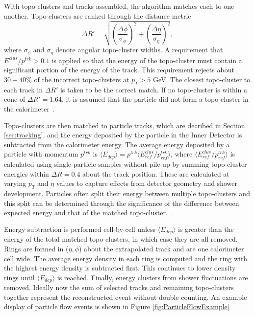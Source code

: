 With topo-clusters and tracks assembled, the algorithm matches each to one another. Topo-clusters are ranked through the distance metric 
\begin{equation}
\Delta R' = \sqrt{(\frac{\Delta \phi}{\sigma_\phi})^2+(\frac{\Delta \eta}{\sigma_\eta})^2},
\end{equation}
where $\sigma_\phi$ and $\sigma_\eta$ denote angular topo-cluster widths. A requirement that $E^{clus}/p^{trk}>0.1$ is applied so that the energy of the topo-cluster must contain a significant portion of the energy of the track. This requirement rejects about $30-40\%$ of the incorrect topo-clusters at $p_T>5$ GeV. The closest topo-cluster to each track in $\Delta R'$ is taken to be the correct match. If no topo-cluster is within a cone of $\Delta R'= 1.64$, it is assumed that the particle did not form a topo-cluster in the calorimeter~\cite{ParticleFlow}. 

Topo-clusters are then matched to particle tracks, which are decribed in Section \ref{sec:tracking}, and the energy deposited by the particle in the Inner Detector is subtracted from the calorimeter energy. The average energy deposited by a particle with momentum $p^{trk}$ is $\langle E_{dep} \rangle=p^{trk}\langle E_{ref}^{clus}/p_{ref}^{trk}\rangle$, where $\langle E_{ref}^{clus}/p_{ref}^{trk} \rangle$ is calculated using single-particle samples without pile-up by summing topo-cluster energies within $\Delta R = 0.4$ about the track position. These are calculated at varying $p_T$ and $\eta$ values to capture effects from detector geometry and shower development. Particles often split their energy between multiple topo-clusters and this split can be determined through the significance of the difference between expected energy and that of the matched topo-cluster.~\cite{ParticleFlow}. 

Energy subtraction is performed cell-by-cell unless $\langle E_{dep} \rangle$ is greater than the energy of the total matched topo-clusters, in which case they are all removed. Rings are formed in ($\eta,\phi$) about the extrapolated track and are one calorimeter cell wide. The average energy density in each ring is computed and the ring with the highest energy density is subtracted first. This continues to lower density rings until $\langle E_{dep} \rangle$ is reached. Finally, energy clusters from shower fluctuations are removed. Ideally now the sum of selected tracks and remaining topo-clusters together represent the reconstructed event without double counting. An example display of particle flow events is shown in Figure \ref{fig:ParticleFlowExample}

